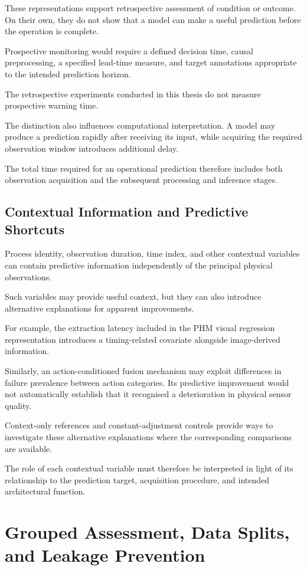 These representations support retrospective assessment of condition or outcome. On their own, they do not show that a model can make a useful prediction before the operation is complete.

Prospective monitoring would require a defined decision time, causal preprocessing, a specified lead-time measure, and target annotations appropriate to the intended prediction horizon.

The retrospective experiments conducted in this thesis do not measure prospective warning time.

The distinction also influences computational interpretation. A model may produce a prediction rapidly after receiving its input, while acquiring the required observation window introduces additional delay.

The total time required for an operational prediction therefore includes both observation acquisition and the subsequent processing and inference stages.

\subsection{Contextual Information and Predictive Shortcuts}

Process identity, observation duration, time index, and other contextual variables can contain predictive information independently of the principal physical observations.

Such variables may provide useful context, but they can also introduce alternative explanations for apparent improvements.

For example, the extraction latency included in the PHM visual regression representation introduces a timing-related covariate alongside image-derived information.

Similarly, an action-conditioned fusion mechanism may exploit differences in failure prevalence between action categories. Its predictive improvement would not automatically establish that it recognised a deterioration in physical sensor quality.

Context-only references and constant-adjustment controls provide ways to investigate these alternative explanations where the corresponding comparisons are available.

The role of each contextual variable must therefore be interpreted in light of its relationship to the prediction target, acquisition procedure, and intended architectural function.

\section{Grouped Assessment, Data Splits, and Leakage Prevention}
\label{sec:ch4-assessment}


